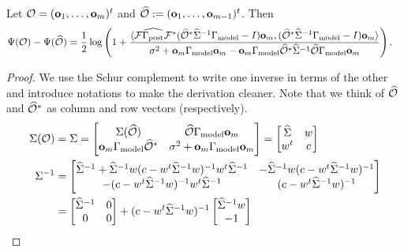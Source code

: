 \documentclass{amsart}
\numberwithin{equation}{section}
\providecommand{\DIFaddend}{} %
\begin{document}
\DIFaddend \begin{lemma}\label{lemma:design increase}
  Let $\mathcal{O} = (\mathbf{o}_1,\dots,\mathbf{o}_m)^t$ and $\widehat{\mathcal{O}} := (\mathbf{o}_1,\dots,\mathbf{o}_{m-1})^t$. Then
  \begin{align*}
    \Psi( \mathcal{O} ) - \Psi (\widehat{\mathcal{O}} ) &=
    \frac12 \log \left ( 1 + \frac{
      \langle \mathcal{F} \widehat{\Gamma_{\textup{post}}} \mathcal{F}^* (\widehat{\mathcal{O}}^* \widehat{\Sigma}^{-1} \Gamma_{\textup{model}} - I ) \mathbf{o}_m,
      (\widehat{\mathcal{O}}^* \widehat{\Sigma}^{-1} \Gamma_{\textup{model}} - I ) \mathbf{o}_m \rangle
    }{
      \sigma^2 + \mathbf{o}_m \Gamma_{\textup{model}} \mathbf{o}_m - \mathbf{o}_m \Gamma_{\textup{model}} \widehat{\mathcal{O}}^* \widehat{\Sigma}^{-1} \widehat{\mathcal{O}} \Gamma_{\textup{model}} \mathbf{o}_m 
    }       
    \right ).
  \end{align*}
\end{lemma}
\begin{proof}
  We use the Schur complement to write one inverse in terms of the other and
  introduce notations to make the derivation cleaner. Note that we think of
  $\widehat{\mathcal{O}}$ and $\widehat{\mathcal{O}}^*$ as column and row vectors (respectively).
  \begin{align*}
    \Sigma( \obs ) &= \Sigma = 
    \begin{bmatrix}
      \Sigma (\obsm )           & \obsm \modcov \meas_m \\
      \meas_m \modcov \obsm^*   & \sigma^2 + \meas_m \modcov \meas_m
    \end{bmatrix}
    =
    \begin{bmatrix}
      \Sigmam   & w \\
      w^t       & c
    \end{bmatrix}\\
    \Sigma^{-1} &=
    \begin{bmatrix}
      \Sigmam^{-1} + \Sigmam^{-1} w ( c - w^t \Sigmam^{-1} w)^{-1} w^t \Sigmam^{-1} & - \Sigmam^{-1} w ( c - w^t \Sigmam^{-1} w)^{-1} \\
      -( c - w^t \Sigmam^{-1} w)^{-1} w^t \Sigmam^{-1}                            &  ( c - w^t \Sigmam^{-1} w)^{-1}
    \end{bmatrix} \\
    &=
    \begin{bmatrix}
      \Sigmam^{-1} & 0 \\
      0           & 0 
    \end{bmatrix}
    + (c -w^t \Sigmam^{-1} w )^{-1}
    \begin{bmatrix}
      \Sigmam^{-1} w \\
      -1
    \end{bmatrix}

\end{align*}
\end{proof}
\end{document}
